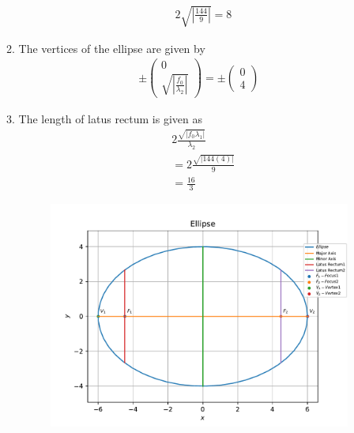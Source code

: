 \documentclass[12pt]{article}
\providecommand{\brak}[1]{\ensuremath{\left(#1\right)}}
\providecommand{\abs}[1]{\left\vert#1\right\vert}
\newcommand{\myvec}[1]{\ensuremath{\begin{pmatrix}#1\end{pmatrix}}}
\begin{document}
\begin{enumerate}
\begin{enumerate}
\begin{align}
        &2\sqrt{\abs{\frac{144}{9}}}= 8
\end{align}
\item The vertices of the ellipse are given by
\begin{align}
 \pm \myvec{0\\\sqrt{\abs{\frac{f_0}{\lambda_2}}}}= \pm \myvec{0\\4}
\end{align}
\item The length of latus rectum is given as
\begin{align}
 &2\frac{\sqrt{\abs{f_0 \lambda_1}}}{\lambda_2} \\
 &= 2\frac{\sqrt{\abs{144\brak{4}}}}{9}\\
 &= \frac{16}{3}
\end{align}
\begin{figure}[!h]
	\begin{center}
		\includegraphics[width=\columnwidth]{figs/fig.pdf}
	\end{center}
\caption{}
\label{fig:Fig1}
\end{figure}
\end{enumerate}
\end{enumerate}
\end{document}

